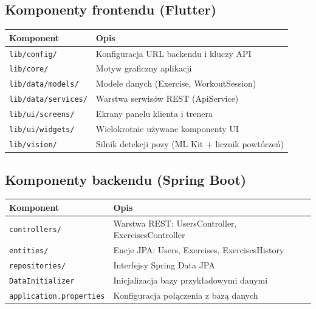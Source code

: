 \documentclass[12pt,a4paper]{article}
\begin{document}
\subsection{Komponenty frontendu (Flutter)}

\begin{center}
\begin{tabular}{lp{8cm}}
  \toprule
  \textbf{Komponent} & \textbf{Opis} \\
  \midrule
  \texttt{lib/config/}        & Konfiguracja URL backendu i kluczy API \\
  \texttt{lib/core/}          & Motyw graficzny aplikacji \\
  \texttt{lib/data/models/}   & Modele danych (Exercise, WorkoutSession) \\
  \texttt{lib/data/services/} & Warstwa serwisów REST (ApiService) \\
  \texttt{lib/ui/screens/}    & Ekrany panelu klienta i trenera \\
  \texttt{lib/ui/widgets/}    & Wielokrotnie używane komponenty UI \\
  \texttt{lib/vision/}        & Silnik detekcji pozy (ML Kit + licznik powtórzeń) \\
  \bottomrule
\end{tabular}
\end{center}

\subsection{Komponenty backendu (Spring Boot)}

\begin{center}
\begin{tabular}{lp{8cm}}
  \toprule
  \textbf{Komponent} & \textbf{Opis} \\
  \midrule
  \texttt{controllers/}    & Warstwa REST: UsersController, ExercisesController \\
  \texttt{entities/}       & Encje JPA: Users, Exercises, ExercisesHistory \\
  \texttt{repositories/}   & Interfejsy Spring Data JPA \\
  \texttt{DataInitializer} & Inicjalizacja bazy przykładowymi danymi \\
  \texttt{application.properties} & Konfiguracja połączenia z bazą danych \\
  \bottomrule
\end{tabular}
\end{center}
\end{document}
